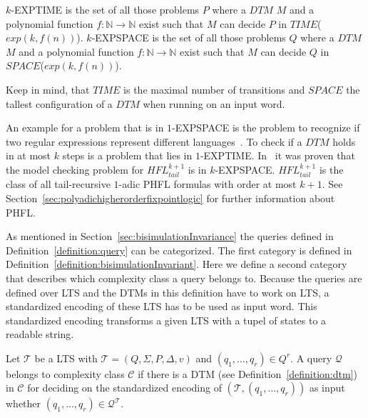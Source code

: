 \begin{definition}
    \label{definition:k_exptime_and_k_expspace}
    $k$-EXPTIME is the set of all those problems $P$ where a $\mathit{DTM}$ $M$ and a polynomial function $f: \mathbb{N}
    \rightarrow \mathbb{N}$ exist such that $M$ can decide $P$ in $\mathit{TIME}$($exp(k, f(n))$).
    $k$-EXPSPACE is the set of all those problems $Q$ where a $\mathit{DTM}$ $M$ and a polynomial function $f: \mathbb{N}
    \rightarrow \mathbb{N}$ exist such that $M$ can decide $Q$ in $\mathit{SPACE}$($exp(k, f(n))$).
\end{definition}

Keep in mind, that $\mathit{TIME}$ is the maximal number of transitions and $\mathit{SPACE}$ the tallest configuration of a
$\mathit{DTM}$ when running on an input word.

An example for a problem that is in $1$-EXPSPACE is the problem to recognize
if two regular expressions represent different languages~\cite{meyer1972equivalence}. To check if a $\mathit{DTM}$
holds in at most $k$ steps is a problem that lies in $1$-EXPTIME. In~\cite{bruse2017space} it was proven that the
model checking problem for $\mathit{HFL}^{k + 1}_{tail}$ is in $k$-EXPSPACE. $\mathit{HFL}^{k + 1}_{tail}$ is the
class of all tail-recursive $1$-adic PHFL formulas with order at most $k + 1$. See
Section~\ref{sec:polyadichigherorderfixpointlogic} for further information about PHFL.

As mentioned in Section~\ref{sec:bisimulationInvariance} the queries defined in Definition~\ref{definition:query} can be categorized. The first category is defined in Definition~\ref{definition:bisimulationInvariant}. Here we define a second category that describes which complexity class a query belongs to. Because the queries are defined over LTS and the DTMs in this definition have to work on LTS, a standardized encoding of these LTS has to be used as input word. This standardized encoding transforms a given LTS with a tupel of states to a readable string.

\begin{definition}
    \label{definition:queryBelongsToComplexityClass}
    Let $\mathcal{T}$ be a LTS with $\mathcal{T} = (Q, \Sigma, P, \Delta, v)$ and $(q_1, \dots, q_{r}) \in Q^r$.
    A query $\mathcal{Q}$ belongs to complexity class $\mathcal{C}$ if there is a DTM (see
    Definition~\ref{definition:dtm}) in $\mathcal{C}$ for deciding on the standardized encoding of $(\mathcal{T}, (q_1, \dots,
    q_{r}))$ as input whether $(q_1, \dots, q_{r}) \in \mathcal{Q}^\mathcal{T}$.
\end{definition}

